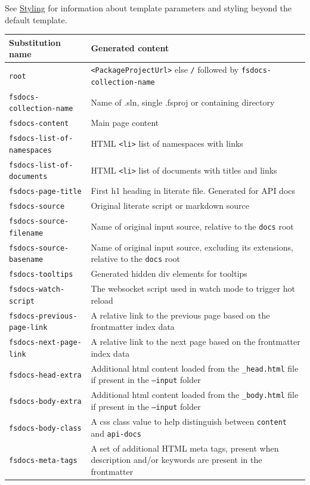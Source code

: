 \documentclass{article}
\begin{document}
See \href{styling.html}{Styling} for information about template parameters and styling beyond the default template.
\begin{tabular}{|l|l|}\hline
\textbf{Substitution name} & \textbf{Generated content}\\ \hline\hline
\texttt{root} & \texttt{<PackageProjectUrl>} else \texttt{/} followed by \texttt{fsdocs-collection-name}\\ \hline
\texttt{fsdocs-collection-name} & Name of .sln, single .fsproj or containing directory\\ \hline
\texttt{fsdocs-content} & Main page content\\ \hline
\texttt{fsdocs-list-of-namespaces} & HTML \texttt{<li>} list of namespaces with links\\ \hline
\texttt{fsdocs-list-of-documents} & HTML \texttt{<li>} list of documents with  titles and links\\ \hline
\texttt{fsdocs-page-title} & First h1 heading in literate file. Generated for API docs\\ \hline
\texttt{fsdocs-source} & Original literate script or markdown source\\ \hline
\texttt{fsdocs-source-filename} & Name of original input source, relative to the \texttt{docs} root\\ \hline
\texttt{fsdocs-source-basename} & Name of original input source, excluding its extensions, relative to the \texttt{docs} root\\ \hline
\texttt{fsdocs-tooltips} & Generated hidden div elements for tooltips\\ \hline
\texttt{fsdocs-watch-script} & The websocket script used in watch mode to trigger hot reload\\ \hline
\texttt{fsdocs-previous-page-link} & A relative link to the previous page based on the frontmatter index data\\ \hline
\texttt{fsdocs-next-page-link} & A relative link to the next page based on the frontmatter index data\\ \hline
\texttt{fsdocs-head-extra} & Additional html content loaded from the \texttt{\_head.html} file if present in the \texttt{--input} folder\\ \hline
\texttt{fsdocs-body-extra} & Additional html content loaded from the \texttt{\_body.html} file if present in the \texttt{--input} folder\\ \hline
\texttt{fsdocs-body-class} & A css class value to help distinguish between \texttt{content} and \texttt{api-docs}\\ \hline
\texttt{fsdocs-meta-tags} & A set of additional HTML meta tags, present when description and/or keywords are present in the frontmatter\\ \hline
\end{tabular}
\end{document}
